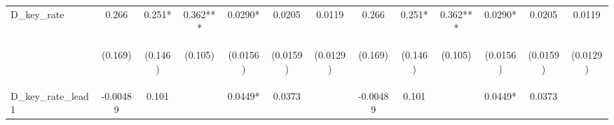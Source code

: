 \documentclass[]{article}
\begin{document}
\begin{center}
\begin{tabular}{lcccccccccccc}
D\_key\_rate & 0.266 & 0.251* & 0.362*** & 0.0290* & 0.0205 & 0.0119 & 0.266 & 0.251* & 0.362*** & 0.0290* & 0.0205 & 0.0119 \\
\vspace{4pt} & \begin{footnotesize}(0.169)\end{footnotesize} & \begin{footnotesize}(0.146)\end{footnotesize} & \begin{footnotesize}(0.105)\end{footnotesize} & \begin{footnotesize}(0.0156)\end{footnotesize} & \begin{footnotesize}(0.0159)\end{footnotesize} & \begin{footnotesize}(0.0129)\end{footnotesize} & \begin{footnotesize}(0.169)\end{footnotesize} & \begin{footnotesize}(0.146)\end{footnotesize} & \begin{footnotesize}(0.105)\end{footnotesize} & \begin{footnotesize}(0.0156)\end{footnotesize} & \begin{footnotesize}(0.0159)\end{footnotesize} & \begin{footnotesize}(0.0129)\end{footnotesize} \\
D\_key\_rate\_lead1 & -0.00489 & 0.101 &  & 0.0449* & 0.0373 &  & -0.00489 & 0.101 &  & 0.0449* & 0.0373 &  \\

\end{tabular}
\end{center}
\end{document}
